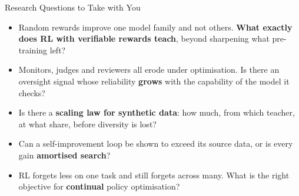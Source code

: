 \begin{frame}{Research Questions to Take with You}
    \begin{itemize}\itemsep0.65em
        \item Random rewards improve one model family and not others. \textbf{What exactly does RL with verifiable rewards teach}, beyond sharpening what pre-training left?
        \item Monitors, judges and reviewers all erode under optimisation. Is there an oversight signal whose reliability \textbf{grows} with the capability of the model it checks?
        \item Is there a \textbf{scaling law for synthetic data}: how much, from which teacher, at what share, before diversity is lost?
        \item Can a self-improvement loop be shown to exceed its source data, or is every gain \textbf{amortised search}?
        \item RL forgets less on one task and still forgets across many. What is the right objective for \textbf{continual} policy optimisation?
    \end{itemize}
\end{frame}
